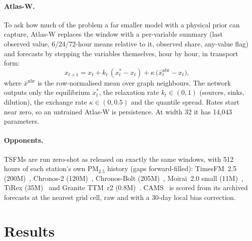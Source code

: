 \documentclass{article}
\newcommand{\pmtf}{PM$_{2.5}$}
\begin{document}
\paragraph{Atlas-W.} To ask how much of the problem a far smaller model with a physical prior can capture, Atlas-W
replaces the window with a per-variable summary (last observed value, 6/24/72-hour means relative to it, observed
share, any-value flag) and forecasts by stepping the variables themselves, hour by hour, in transport form:
\begin{equation}
x_{t+1} = x_t + k_t\,(x^{*}_t - x_t) + \kappa\,\big(\bar{x}^{\mathrm{nbr}}_t - x_t\big),
\label{eq:atlasw}
\end{equation}
where $\bar{x}^{\mathrm{nbr}}$ is the row-normalised mean over graph neighbours. The network outputs only the
equilibrium $x^*_t$, the relaxation rate $k_t\in(0,1)$ (sources, sinks, dilution), the exchange rate
$\kappa\in(0,0.5)$ and the quantile spread. Rates start near zero, so an untrained Atlas-W is persistence. At width 32
it has 14,043 parameters.

\paragraph{Opponents.} TSFMs are run zero-shot as released on exactly the same windows, with 512 hours of each
station's own \pmtf{} history (gaps forward-filled): TimesFM~2.5 (200M)~\citep{timesfm25}, Chronos-2
(120M)~\citep{ansari2025chronos2}, Chronos-Bolt (205M)~\citep{chronosbolt}, Moirai~2.0 small (11M)~\citep{moirai2},
TiRex (35M)~\citep{auer2025tirex} and Granite TTM~r2 (0.8M)~\citep{ekambaram2024ttm}. CAMS~\citep{inness2019cams} is
scored from its archived forecasts at the nearest grid cell, raw and with a 30-day local bias correction.

\section{Results}
\label{sec:results}
\end{document}
